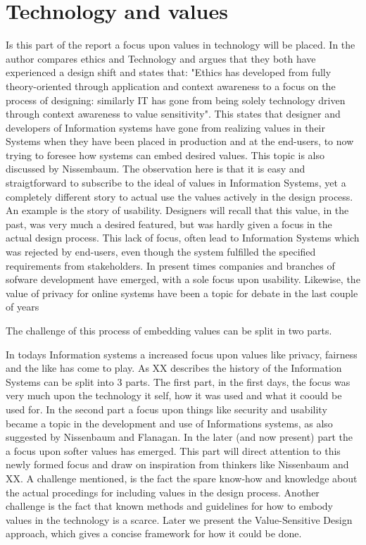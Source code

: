 
\section{Technology and values}
Is this part of the report a focus upon values in technology will be placed. In  the author compares ethics and Technology and argues that they both have experienced a design shift and states that: "Ethics has developed from fully theory-oriented through application and context awareness to a focus on the process of designing: similarly IT has gone from being solely technology driven through context awareness to value sensitivity". This states that designer and developers of Information systems have gone from realizing values in their Systems when they have been placed in production and at the end-users, to now trying to foresee how systems can embed desired values. This topic is also discussed by Nissembaum. The observation here is that it is easy and straigtforward to subscribe to the ideal of values in Information Systems, yet a completely different story to actual use the values actively in the design process. An example is the story of usability. Designers will recall that this value, in the past, was very much a desired featured, but was hardly given a focus in the actual design process. This lack of focus, often lead to Information Systems which was rejected by end-users, even though the system fulfilled the specified requirements from stakeholders. In present times companies and branches of sofware development have emerged, with a sole focus upon usability. Likewise, the value of privacy for online systems have been a topic for debate in the last couple of years

The challenge of this process of embedding values can be split in two parts. 

In todays Information systems a increased focus upon values like privacy, fairness and the like has come to play. As XX describes the history of the Information Systems can be split into 3 parts. The first part, in the first days, the focus was very much upon the technology it self, how it was used and what it coould be used for. In the second part a focus upon things like security and usability became a topic in the development and use of Informations systems, as also suggested by Nissenbaum and Flanagan. In the later (and now present) part the a focus upon softer values has emerged. This part will direct attention to this newly formed focus and draw on inspiration from thinkers like Nissenbaum and XX. A challenge mentioned, is the fact the spare know-how and knowledge about the actual procedings for including values in the design process. Another challenge is the fact that known methods and guidelines for how to embody values in the technology is a scarce. Later we present the Value-Sensitive Design approach, which gives a concise framework for how it could be done. 

